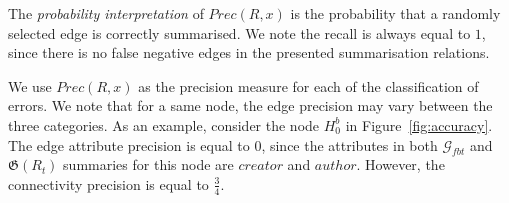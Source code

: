 The \emph{probability interpretation} of $Prec(R, x)$ is the probability that a randomly selected edge is correctly summarised. We note the recall is always equal to $1$, since there is no false negative edges in the presented summarisation relations.

We use $Prec(R, x)$ as the precision measure for each of the classification of errors. We note that for a same node, the edge precision may vary between the three categories. As an example, consider the node $H^b_0$ in Figure~\ref{fig:accuracy}. The edge attribute precision is equal to $0$, since the attributes in both $\mathcal{G}_{fbt}$ and $\mathfrak{G}(R_t)$ summaries for this node are $creator$ and $author$. However, the connectivity precision is equal to $\frac{3}{4}$.
